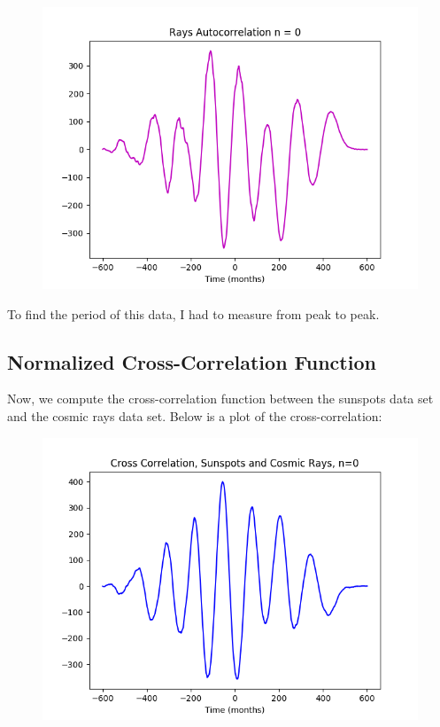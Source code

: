\documentclass[12pt]{article}
\begin{document}
\begin{figure}[H]
\begin{center}
\includegraphics[scale=0.8]{rays_ac.png}
\end{center}
\end{figure}

To find the period of this data, I had to measure from peak to peak.


\subsection*{Normalized Cross-Correlation Function}


Now, we compute the cross-correlation function between the sunspots data set and the cosmic rays data set. Below is a plot of the cross-correlation:

\begin{figure}[H]
\begin{center}
\includegraphics[scale=0.8]{cross.png}
\end{center}
\end{figure}
\end{document}

